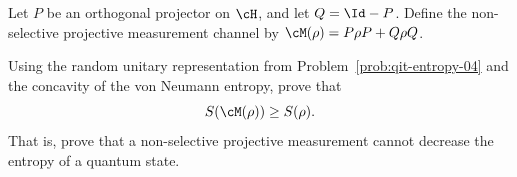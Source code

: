 Let $P$ be an orthogonal projector on $\cH$, and let $Q=\Id-P$. Define the non-selective projective measurement channel by $\cM(\rho)=P\rho P+Q\rho Q$.

Using the random unitary representation from Problem~\ref{prob:qit-entropy-04} and the concavity of the von Neumann entropy, prove that
$$
S(\cM(\rho))\geq S(\rho).
$$
That is, prove that a non-selective projective measurement cannot decrease the entropy of a quantum state.

